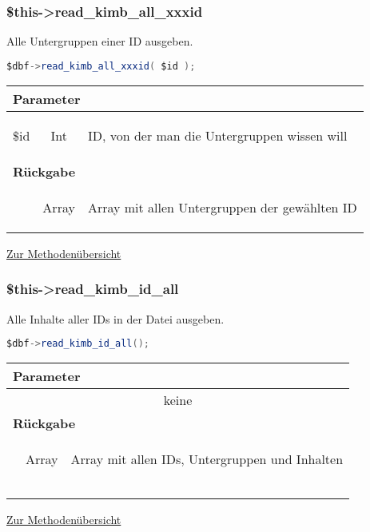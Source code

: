 \documentclass[paper=A4,pagesize=auto,12pt,headinclude=true,footinclude=true,BCOR=0mm,DIV=calc]{scrartcl}
\begin{document}
  \subsubsection{\$this->read\_kimb\_all\_xxxid}
  \label{sec:mth_id_all_xx}
	    Alle Untergruppen einer ID ausgeben.
	    \begin{lstlisting}[gobble=4,language=Java]
	      $dbf->read_kimb_all_xxxid( $id );
	    \end{lstlisting}
	    
	     \begin{tabular}{|lcp{}|}
		    \hline
		      \multicolumn{3}{|l|}{ \textbf{Parameter} } \\
		    \hline
		      \$id & Int & \begin{itshape} ID, von der man die Untergruppen wissen will \end{itshape} \\
		    \hline
		      \multicolumn{3}{|l|}{ \textbf{Rückgabe} } \\
		    \hline
			  & Array & \begin{itshape} Array mit allen Untergruppen der gewählten ID \end{itshape} \\
		    \hline
	    \end{tabular}
	    \begin{flushright} \small \hyperref[tab:methodenuerbersicht]{Zur Methodenübersicht} \end{flushright}

	    
\subsubsection{\$this->read\_kimb\_id\_all}
 \label{sec:mth_id_all}
	    Alle Inhalte aller IDs in der Datei ausgeben.
	    \begin{lstlisting}[gobble=4,language=Java]
	      $dbf->read_kimb_id_all();
	    \end{lstlisting}
	    
	     \begin{tabular}{|lcp{}|}
		    \hline
		      \multicolumn{3}{|l|}{ \textbf{Parameter} } \\
		    \hline
		       \multicolumn{3}{|c|}{ keine } \\
		    \hline
		      \multicolumn{3}{|l|}{ \textbf{Rückgabe} } \\
		    \hline
			  & Array & \begin{itshape} Array mit allen IDs, Untergruppen und Inhalten \end{itshape} \\
			  &  & \lstinline* array( ID =>   * \\
			  &  & \lstinline* 	array( XXXID => Inhalt, ... ), * \\
			  &  & \lstinline*ID => .... ) * \\

		    \hline
	    \end{tabular}
	    \begin{flushright} \small \hyperref[tab:methodenuerbersicht]{Zur Methodenübersicht} \end{flushright}
  
\end{document}
